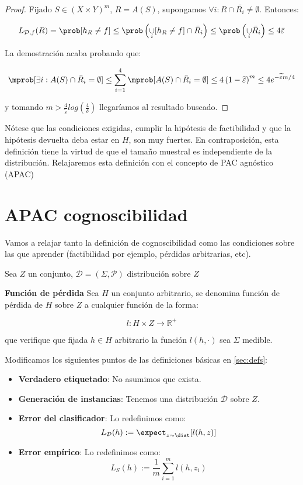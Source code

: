 \begin{example}
\begin{proof}
    Fijado $S\in (X\times Y)^m$, $R=A(S)$, supongamos $\forall i : R \cap \bar{R_i} \neq \emptyset$. Entonces:

    \[L_{\mathcal{D},f}(R) = \prob [h_R \neq f] \le \prob 
    \left(\underset{i}{\cup} [h_R \neq f] \cap \bar{R}_i\right) \le \prob \left(\underset{i}{\cup} 
    \bar{R}_i\right) \le 4 \bar{\varepsilon}\]

    La demostración acaba probando que:

    \[\mprob [\exists i : A(S)\cap \bar{R}_i = \emptyset] \le \sum_{i=1}^4 
    \mprob[A(S)\cap \bar{R}_i = \emptyset] \le 4 \left(1-\widetilde{\varepsilon} \right)^m \le 4e^{-\widetilde{\varepsilon}m/4}\]

    y tomando $m > \frac{4}{\widetilde{\varepsilon}} log \left( \frac{4}{\delta} \right)$ llegaríamos al resultado buscado.
    \end{proof}
\end{example}


Nótese que las condiciones exigidas, cumplir la hipótesis de factibilidad y que la hipótesis devuelta deba estar en $H$, 
son muy fuertes. En contraposición, esta definición tiene la virtud de que el tamaño muestral es independiente de la 
distribución. Relajaremos esta definición con el concepto de PAC agnóstico (APAC)


\section{APAC cognoscibilidad}

Vamos a relajar tanto la definición de cognoscibilidad como las condiciones sobre las que aprender 
(factibilidad por ejemplo, pérdidas arbitrarias, etc).

Sea $Z$ un conjunto, $\mathcal{D} = (\Sigma, \mathcal{P})$ distribución sobre $Z$

\begin{definition} \textbf{Función de pérdida}
Sea $H$ un conjunto arbitrario, se denomina función de pérdida de $H$ sobre $Z$ a cualquier función de la 
forma:

\[l : H \times Z \rightarrow \mathbb{R}^{+}\]

que verifique que fijada $h\in H$ arbitrario la función $l(h, \cdot)$ sea $\Sigma$ medible.
\end{definition}

Modificamos los siguientes puntos de las definiciones básicas en \ref{sec:defs}:

\begin{itemize}
  \item \textbf{Verdadero etiquetado}: No asumimos que exista.

  \item \textbf{Generación de instancias}: Tenemos una distribución $\mathcal{D}$ sobre $Z$.
  \item \textbf{Error del clasificador}: Lo redefinimos como:
  \[L_{\mathcal{D}}(h) :=  \expect_{z\sim \dist} [l(h,z)]\]
  
  \item \textbf{Error empírico}: Lo redefinimos como:
  \[L_{S} (h) := \frac{1}{m} \sum_{i=1}^m l(h,z_i)\]
\end{itemize}

